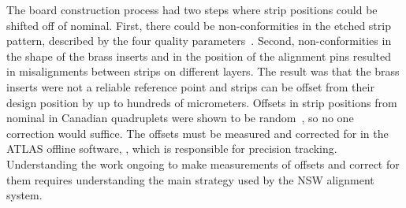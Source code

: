 
The board construction process had two steps where strip positions could be shifted off of nominal. First, there could be non-conformities in the etched strip pattern, described by the four quality parameters~\cite{carlson_results_2019}. Second, non-conformities in the shape of the brass inserts and in the position of the alignment pins resulted in misalignments between strips on different layers. The result was that the brass inserts were not a reliable reference point and strips can be offset from their design position by up to hundreds of micrometers. Offsets in strip positions from nominal in Canadian quadruplets were shown to be random~\cite{carlson_results_2019}, so no one correction would suffice. The offsets must be measured and corrected for in the ATLAS offline software, , which is responsible for precision tracking. Understanding the work ongoing to make measurements of offsets and correct for them requires understanding the main strategy used by the NSW alignment system.



